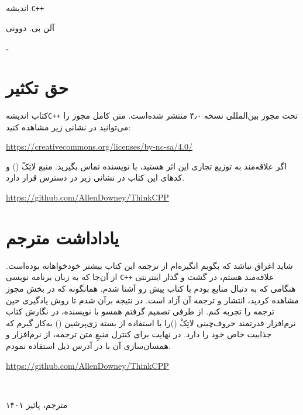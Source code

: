 \documentclass{book}
\begin{document}
\thispagestyle{empty}
\begin{titlepage}
 \vspace*{1cm}
 
 
 {\huge\raggedleft اندیشه \texttt{C++} \par}
 \noindent\hrulefill\par
 {\LARGE\raggedright آلن بی. دوونی\par}
 \vfill
 {\small\raggedright ـ\par}
 \setcounter{page}{0}
\end{titlepage}


\section{حق تکثیر}
کتاب اندیشه\texttt{C++} تحت مجوز بین‌المللی    نسخه ۴٫۰ منتشر شده‌است. 
متن کامل مجوز را می‌توانید در نشانی زیر مشاهده کنید:

\begin{latin}
\url{https://creativecommons.org/licenses/by-nc-sa/4.0/}
\end{latin}
اگر علاقه‌مند به توزیع تجاری این اثر هستید، با نویسنده تماس بگیرید. 
منبع لاتِکْ (\lr{\LaTeX}) و کدهای این کتاب در نشانی زیر در دسترس قرار دارد.
\begin{latin}
	\url{https://github.com/AllenDowney/ThinkCPP}
\end{latin}

\newpage

\section{یاداداشت مترجم}
شاید اغراق نباشد که بگویم انگیزه‌ام از ترجمه این کتاب بیشتر خودخواهانه بوده‌است. از آن‌جا که به زبان برنامه نویسی \texttt{C++}  علاقه‌مند هستم، در گشت و گذار اینترنتی هنگامی که به دنبال منابع بودم با کتاب پیش رو آشنا شدم. همانگونه که در بخش مجوز مشاهده کردید، انتشار و ترجمه آن آزاد است. در نتیجه برآن شدم تا روش یادگیری حین ترجمه را تجربه کنم. از طرفی تصمیم گرفتم همسو با نویسنده، در نگارش کتاب نرم‌افزار قدرتمند حروف‌چینی لاتِکْ (\lr{\LaTeX})را با استفاده از بسته زی‌پرشین  (\lr{\XePersian}) به‌کار گیرم که جذابیت خاص خود را دارد. در نهایت برای کنترل منبعِ متن ترجمه، از نرم‌افزار  و همسان‌سازی آن با  در آدرس ذیل استفاده نمودم.
\begin{latin}
	\url{https://github.com/AllenDowney/ThinkCPP}
\end{latin}
\
\begin{flushleft}
	مترجم، پائیز ۱۴۰۱
	
\end{flushleft}

\frontmatter
\tableofcontents

\mainmatter



\appendix


\printindex
\end{document}
